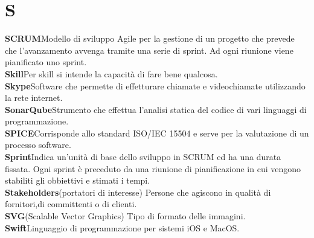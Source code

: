\newpage
\section{S}\label{l:S}

\textbf{SCRUM}\newline Modello di sviluppo Agile per la gestione di un progetto che prevede che l'avanzamento avvenga tramite una serie di sprint. Ad ogni riunione viene pianificato uno sprint.\\
\newline
\textbf{Skill}\newline Per skill si intende la capacità di fare bene qualcosa.\\
\newline
\textbf{Skype}\newline Software che permette di effetturare chiamate e videochiamate utilizzando la rete internet.\\
\newline
\textbf{SonarQube}\newline Strumento che effettua l'analisi statica del codice di vari linguaggi di programmazione.\\
\newline
\textbf{SPICE}\newline Corrisponde allo standard ISO/IEC 15504 e serve per la valutazione di un processo software.\\
\newline
\textbf{Sprint}\newline Indica un'unità di base dello sviluppo in SCRUM ed ha una durata fissata. Ogni sprint è preceduto da una riunione di pianificazione in cui vengono stabiliti gli obbiettivi e stimati i tempi.\\
\newline
\textbf{Stakeholders}\newline (portatori di interesse) Persone che agiscono in qualità di fornitori,di committenti o di clienti.\\
\newline
\textbf{SVG}\newline (Scalable Vector Graphics) Tipo di formato delle immagini.\\
\newline
\textbf{Swift}\newline Linguaggio di programmazione per sistemi iOS e MacOS.
